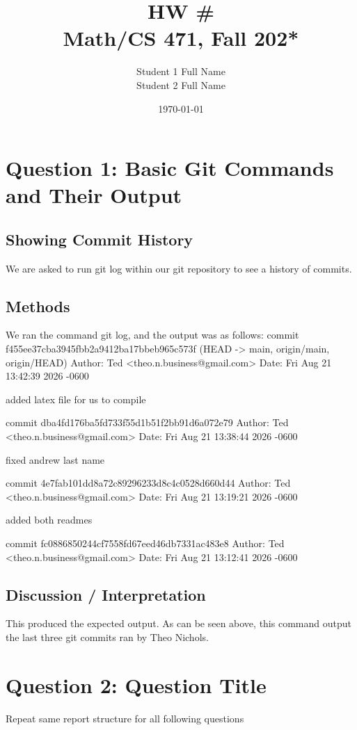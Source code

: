 \documentclass[12pt]{article}
\title{ HW \# \\ Math/CS 471, Fall 202*}
\author{Student 1 Full Name \\ Student 2 Full Name}
\date{\today}   %
\begin{document}
\maketitle
\clearpage

\section{Question 1: Basic Git Commands and Their Output}

\subsection{Showing Commit History}
We are asked to run git log within our git repository to see a history of commits.

\subsection{Methods}
We ran the command git log, and the output was as follows:
commit f455ee37cba3945fbb2a9412ba17bbeb965c573f (HEAD -> main, origin/main, origin/HEAD)
Author: Ted <theo.n.business@gmail.com>
Date:   Fri Aug 21 13:42:39 2026 -0600

    added latex file for us to compile

commit dba4fd176ba5fd733f55d1b51f2bb91d6a072e79
Author: Ted <theo.n.business@gmail.com>
Date:   Fri Aug 21 13:38:44 2026 -0600

    fixed andrew last name

commit 4e7fab101dd8a72c89296233d8c4c0528d660d44
Author: Ted <theo.n.business@gmail.com>
Date:   Fri Aug 21 13:19:21 2026 -0600

    added both readmes

commit fc0886850244cf7558fd67eed46db7331ac483e8
Author: Ted <theo.n.business@gmail.com>
Date:   Fri Aug 21 13:12:41 2026 -0600


\subsection{Discussion / Interpretation} 
This produced the expected output. As can be seen above, this command output the last three git commits ran by Theo Nichols. 

\section{Question 2: Question Title}

Repeat same report structure for all following questions\\\\
\end{document}
